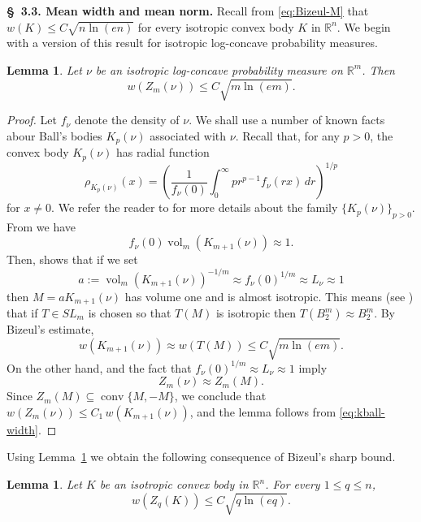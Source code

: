 \documentclass[10pt,a4paper]{amsart}
\newtheorem{lemma}[theorem]{Lemma}
\numberwithin{equation}{section}
\newcommand{\ls}{\leqslant}
\DeclareMathOperator{\vol}{vol}
\begin{document}
\medskip 

\noindent \textbf{\S~3.3. Mean width and mean norm.} Recall from \eqref{eq:Bizeul-M} that $w(K)\ls C\sqrt{n\ln(en)}$ for every isotropic
convex body $K$ in $\mathbb{R}^n$. We begin with a version of this result for isotropic log-concave probability measures.


\begin{lemma}\label{lem:measure-bizeul}Let $\nu$ be an isotropic log-concave probability measure on $\mathbb{R}^m$. Then
\begin{equation}\label{eq:width-measure}w(Z_m(\nu))\ls C\sqrt{m\ln(em)}.\end{equation}
\end{lemma}

\begin{proof}Let $f_{\nu}$ denote the density of $\nu$. We shall use a number of known facts abour Ball's bodies $K_p(\nu)$ associated with $\nu$. 
Recall that, for any $p>0$, the convex body $K_p(\nu)$ has radial function
$$\rho_{K_p(\nu)}(x)=\left (\frac{1}{f_{\nu}(0)}\int_0^{\infty}pr^{p-1}f_{\nu}(rx)\,dr\right )^{1/p}$$ for $x\neq 0$.
We refer the reader to \cite{BGVV-book} for more details about the family $\{K_p(\nu)\}_{p>0}$. From \cite[Proposition~2.5.8]{BGVV-book} we have 
$$f_{\nu}(0) \vol_m(K_{m+1}(\nu)) \approx 1.$$
Then, \cite[Proposition~2.5.12]{BGVV-book} shows that if we set 
$$a:=\vol_m(K_{m+1}(\nu))^{-1/m}\approx f_{\nu}(0)^{1/m}\approx L_{\nu}\approx 1$$ 
then $M=aK_{m+1}(\nu)$ has volume one and is almost isotropic. 
This means (see \cite[Definition~2.5.11]{BGVV-book}) that if $T\in SL_m$ is chosen so that $T(M)$ is isotropic then $T(B_2^m)\approx B_2^m$.
By Bizeul's estimate,
\begin{equation}\label{eq:kball-width}w(K_{m+1}(\nu))\approx w(T(M))\ls C\sqrt{m\ln(em)}.\end{equation}
On the other hand, \cite[Theorem~5.1.7]{BGVV-book} and the fact that $f_{\nu}(0)^{1/m}\approx L_{\nu}\approx 1$ imply
$$Z_m(\nu)\approx Z_m(M).$$
Since $Z_m(M)\subseteq \operatorname{conv}\{M,-M\}$, we conclude that $w(Z_m(\nu))\ls C_1\,w(K_{m+1}(\nu))$, and the lemma follows from \eqref{eq:kball-width}.
\end{proof}

Using Lemma~\ref{lem:measure-bizeul} we obtain the following consequence of Bizeul's sharp bound. 

\begin{lemma}\label{lem:Zq-width}Let $K$ be an isotropic convex body in $\mathbb{R}^n$. For every $1\ls q\ls n$,
$$w(Z_q(K))\ls C\sqrt{q\ln(eq)}.$$
\end{lemma}
\end{document}
